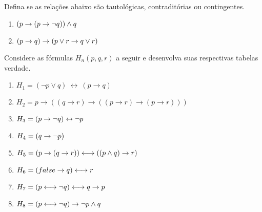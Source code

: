 \documentclass[a4paper, 11pt]{article}
\begin{document}
    \begin{question}
        Defina se as relações abaixo são tautológicas, contraditórias ou contingentes.
        \vspace*{-3mm}
        \begin{enumerate}[itemsep=-1mm]
            \item $(p \rightarrow (p \rightarrow \lnot q)) \land q$
            \item $(p \rightarrow q) \rightarrow (p \lor r \rightarrow q \lor r)$
        \end{enumerate}
    \end{question}



    \begin{question}
        Considere as fórmulas $H_n(p, q, r)$ a seguir e desenvolva suas respectivas tabelas verdade.
        \vspace{-3mm}
        \begin{enumerate}[itemsep=-1mm]
            \item[] $H_1 = (\lnot p \lor q)~\leftrightarrow~(p \rightarrow q)$
            \item[] $H_2 = p \rightarrow ((q \rightarrow r) \rightarrow ((p \rightarrow r) \rightarrow (p \rightarrow r)))$ 
            \item[] $H_3 = (p \rightarrow \lnot q) \leftrightarrow \lnot p $
            \item[] $H_4 = (q \rightarrow \lnot p) $
            \item[] $H_5 = (p \rightarrow (q \rightarrow r)) \longleftrightarrow ((p \land q) \rightarrow r) $
            \item[] $H_6 = (false \rightarrow q) \longleftrightarrow r$
            \item[] $H_7 = (p \longleftrightarrow \lnot q) \longleftrightarrow q \rightarrow p$
            \item[] $H_8 = (p \longleftrightarrow \lnot q) \rightarrow \lnot p \land q$
        \end{enumerate}
    \end{question}
    
\end{document}
